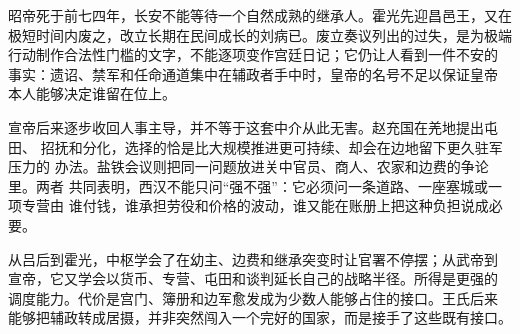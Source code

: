 昭帝死于前七四年，长安不能等待一个自然成熟的继承人。霍光先迎昌邑王，又在
极短时间内废之，改立长期在民间成长的刘病已。废立奏议列出的过失，是为极端
行动制作合法性门槛的文字，不能逐项变作宫廷日记；它仍让人看到一件不安的
事实：遗诏、禁军和任命通道集中在辅政者手中时，皇帝的名号不足以保证皇帝
本人能够决定谁留在位上。

宣帝后来逐步收回人事主导，并不等于这套中介从此无害。赵充国在羌地提出屯田、
招抚和分化，选择的恰是比大规模推进更可持续、却会在边地留下更久驻军压力的
办法。盐铁会议则把同一问题放进关中官员、商人、农家和边费的争论里。两者
共同表明，西汉不能只问“强不强”：它必须问一条道路、一座塞城或一项专营由
谁付钱，谁承担劳役和价格的波动，谁又能在账册上把这种负担说成必要。

\begin{turningpoint}[西汉晚期的制度得失]
从吕后到霍光，中枢学会了在幼主、边费和继承突变时让官署不停摆；从武帝到
宣帝，它又学会以货币、专营、屯田和谈判延长自己的战略半径。所得是更强的
调度能力。代价是宫门、簿册和边军愈发成为少数人能够占住的接口。王氏后来
能够把辅政转成居摄，并非突然闯入一个完好的国家，而是接手了这些既有接口。
\end{turningpoint}
